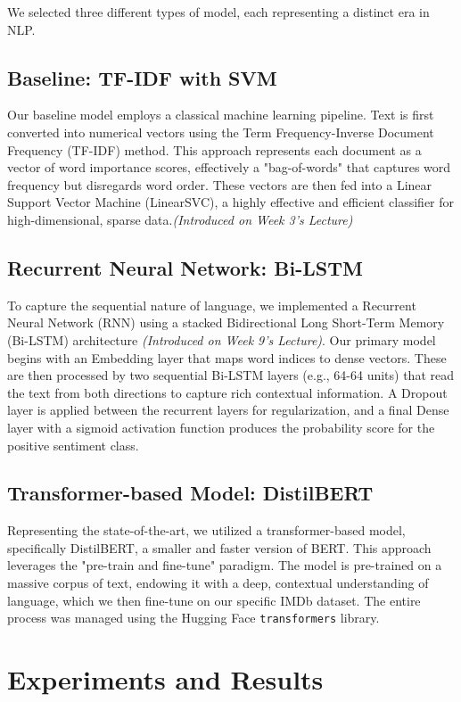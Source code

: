\documentclass[11pt]{article}
\begin{document}
We selected three different types of model, each representing a distinct era in NLP.

\subsection{Baseline: TF-IDF with SVM}
Our baseline model employs a classical machine learning pipeline. Text is first converted into numerical vectors using the Term Frequency-Inverse Document Frequency (TF-IDF) method. This approach represents each document as a vector of word importance scores, effectively a "bag-of-words" that captures word frequency but disregards word order. These vectors are then fed into a Linear Support Vector Machine (LinearSVC), a highly effective and efficient classifier for high-dimensional, sparse data.\textit{(Introduced on Week 3's Lecture)}

\subsection{Recurrent Neural Network: Bi-LSTM}
To capture the sequential nature of language, we implemented a Recurrent Neural Network (RNN) using a stacked Bidirectional Long Short-Term Memory (Bi-LSTM) architecture \textit{(Introduced on Week 9's Lecture)}. Our primary model begins with an Embedding layer that maps word indices to dense vectors. These are then processed by two sequential Bi-LSTM layers (e.g., 64-64 units) that read the text from both directions to capture rich contextual information. A Dropout layer is applied between the recurrent layers for regularization, and a final Dense layer with a sigmoid activation function produces the probability score for the positive sentiment class.

\subsection{Transformer-based Model: DistilBERT}
Representing the state-of-the-art, we utilized a transformer-based model, specifically DistilBERT, a smaller and faster version of BERT. This approach leverages the "pre-train and fine-tune" paradigm. The model is pre-trained on a massive corpus of text, endowing it with a deep, contextual understanding of language, which we then fine-tune on our specific IMDb dataset. The entire process was managed using the Hugging Face \texttt{transformers} library.

\section{Experiments and Results}
\end{document}
